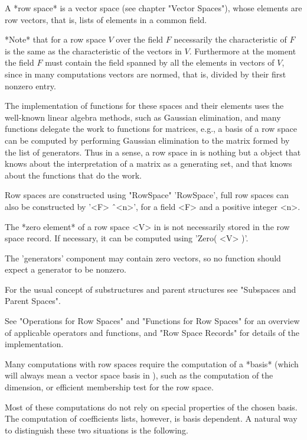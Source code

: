 
A *row space* is a vector space (see chapter "Vector Spaces"), whose elements
are row vectors, that is, lists of elements in a common field.

*Note* that for a row space $V$ over the field $F$ necessarily the
characteristic of $F$ is the same as the characteristic of the vectors in
$V$.
Furthermore at the moment the field $F$ must contain the field spanned by all
the elements in vectors of $V$, since in many computations vectors are
normed, that is, divided by their first nonzero entry.

The implementation of functions for these spaces and their elements uses the
well-known linear algebra methods, such as Gaussian elimination, and many
functions delegate the work to functions for matrices, e.g., a basis of a
row space can be computed by performing Gaussian elimination to the matrix
formed by the list of generators.  Thus in a sense, a row space in {\GAP} is
nothing but a {\GAP} object that knows about the interpretation of a matrix
as a generating set, and that knows about the functions that do the work.

Row spaces are constructed using "RowSpace" 'RowSpace', full row spaces can
also be constructed by '<F> \^\ <n>', for a field <F> and a positive integer
<n>.

The *zero element* of a row space <V> in {\GAP} is not necessarily stored in
the row space record.  If necessary, it can be computed using 'Zero( <V> )'.

The 'generators' component may contain zero vectors, so no function should
expect a generator to be nonzero.

For the usual concept of substructures and parent structures see "Subspaces
and Parent Spaces".

See "Operations for Row Spaces" and "Functions for Row Spaces" for an
overview of applicable operators and functions, and "Row Space Records" for
details of the implementation.


Many computations with row spaces require the computation of a *basis*
(which will always mean a vector space basis in {\GAP}), such as the
computation of the dimension, or efficient membership test for the row
space.

Most of these computations do not rely on special properties of the chosen
basis.  The computation of coefficients lists, however, is basis dependent.
A natural way to distinguish these two situations is the following.

